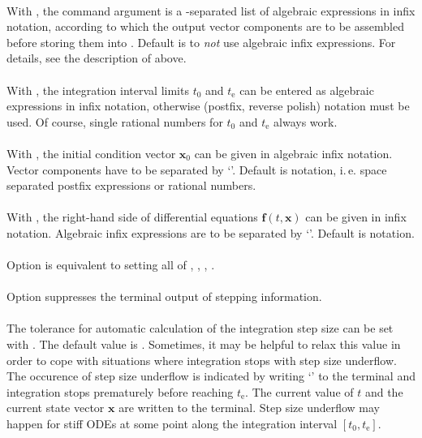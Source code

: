 \documentclass[11pt,english,BCOR10mm,DIV12,bibliography=totoc,parskip=false,smallheadings
    headexclude,footexclude,oneside,dvips,UKenglish]{pst-doc}
\begin{document}
\noindent{}\\
With , the command argument  is a \Lkeyword{|}-separated list of algebraic expressions in infix notation, according to which the output vector components are to be assembled before storing them into . Default is to  \emph{not} use algebraic infix expressions. For details, see the description of  above.\\

\noindent{}\\
With , the integration interval limits $t_0$ and $t_\mathrm{e}$ can be entered as algebraic expressions in infix notation, otherwise \PS{} (postfix, reverse polish) notation must be used. Of course, single rational numbers for  $t_0$ and $t_\mathrm{e}$ always work.\\

\noindent{}\\
With , the initial condition vector $\mathbf{x}_0$ can be given in algebraic infix notation. Vector components have to be separated by `\Lkeyword{|}'. Default is \PS{} notation, i.\,e. space separated postfix expressions or rational numbers.\\

\noindent{}\\
With , the right-hand side of differential equations $\mathbf{f}(t,\mathbf{x})$ can be given in infix notation. Algebraic infix expressions are to be separated by `\Lkeyword{|}'. Default is \PS{} notation.\\

\noindent{}\\
Option  is equivalent to setting all of , , , .\\

\noindent{}\\
Option  suppresses the terminal output of stepping information.\\

\noindent{}\\
The tolerance for automatic calculation of the integration step size can be set with . The default value is . Sometimes, it may be helpful to relax this value in order to cope with situations where integration stops with step size underflow. The occurence of step size underflow is indicated by writing `\Lkeyword{!}' to the terminal and integration stops prematurely before reaching $t_\mathrm{e}$. The current value of $t$ and the current state vector $\mathbf{x}$ are written to the terminal. Step size underflow may happen for stiff ODEs at some point along the integration interval $[t_0, t_\mathrm{e}]$.\\[1ex]
\end{document}
